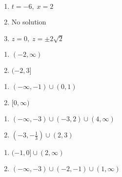 \documentclass{ximera}
\begin{document}
\begin{multicols}{3}
\begin{enumerate}
\setcounter{enumi}{\value{HW}}

\item $t = -6, \; x = 2$
\item No solution
\item $z = 0, \; z = \pm 2\sqrt{2}$

\setcounter{HW}{\value{enumi}}
\end{enumerate}
\end{multicols}

\begin{multicols}{2}
\begin{enumerate}
\setcounter{enumi}{\value{HW}}

\item $(-2, \infty)$
\item $(-2, 3]$

\setcounter{HW}{\value{enumi}}
\end{enumerate}
\end{multicols}

\begin{multicols}{2}
\begin{enumerate}
\setcounter{enumi}{\value{HW}}


\item $(-\infty, -1) \cup (0, 1)$
\item $[0, \infty)$

\setcounter{HW}{\value{enumi}}
\end{enumerate}
\end{multicols}

\begin{multicols}{2}
\begin{enumerate}
\setcounter{enumi}{\value{HW}}

\item $(-\infty, -3) \cup (-3,2) \cup (4, \infty)$
\item $\left(-3, -\frac{1}{3} \right) \cup (2,3)$

\setcounter{HW}{\value{enumi}}
\end{enumerate}
\end{multicols}

\begin{multicols}{2}
\begin{enumerate}
\setcounter{enumi}{\value{HW}}

\item $(-1,0] \cup (2, \infty)$
\item $(-\infty, -3) \cup (-2, -1) \cup (1, \infty)$

\setcounter{HW}{\value{enumi}}
\end{enumerate}
\end{multicols}
\end{document}
